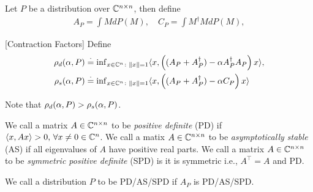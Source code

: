 \begin{definition}
Let $P$ be a distribution over $\mathbb{C}^{n\times n}$, then define
\begin{align*}
A_P=\int M dP(M),\quad C_P=\int M^\dag M dP(M),
\end{align*}
\end{definition}
\begin{definition}\label{def:contract}[Contraction Factors]
Define
\begin{align*}
\rho_d(\alpha,P)&\stackrel{\cdot}{=} {\inf}_{x\in\mathbb{C}^n\colon\left\| x\right\|=1}\langle x,\left((A_P+A_P^\dag)-\alpha A_P^\dag A_P\right)x\rangle,\\ \rho_s(\alpha,P)&\stackrel{\cdot}{=}{\inf}_{x\in \mathbb{C}^n\colon\left\| x\right\|=1}\langle x,\left((A_P+A_P^\dag)-\alpha C_P\right)x\rangle
\end{align*}
\end{definition}
Note that $\rho_d(\alpha,P)>\rho_s(\alpha,P)$.

\begin{definition}
We call a matrix $A\in \mathbb{C}^{n\times n}$ to be \emph{positive definite} (PD) if $\langle x,Ax\rangle >0,\,\forall x\neq 0 \in \mathbb{C}^{n}$. We call a matix $A\in \mathbb{C}^{n\times n}$ to be \emph{asymptotically stable} (AS) if all eigenvalues of $A$ have positive real parts. We call a matrix $A\in \mathbb{C}^{n\times n}$ to be \emph{symmetric positive definite} (SPD) is it is symmetric i.e., $A^\top=A$ and PD.
\end{definition}
\begin{definition}\label{distpd}
We call a distribution $P$ to be PD/AS/SPD if $A_P$ is PD/AS/SPD.
\end{definition}

